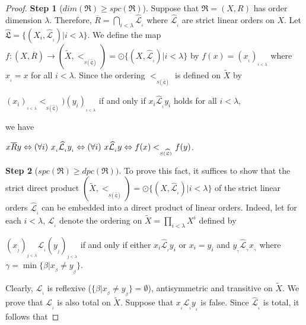 \documentclass{article}
\theoremstyle{definition}
\begin{document}
\begin{proof}{\bf Step 1} ($dim(\mathfrak{R})\geq spc(\mathfrak{R})$).
Suppose that $\mathfrak{R}=(X,R)$ has order dimension $\lambda$. Therefore, 
$\overline{R}=\displaystyle\bigcap_{i<\lambda}\widehat{\mathcal{L}}_{_i}$ where $\widehat{\mathcal{L}}_{_i}$ are strict linear orders
on $X$. Let $\widehat{\mathfrak{L}}=\{(X_i,\widehat{\mathcal{L}}_{_i})\vert i<\lambda\}$.
We define the map $f:(X,\overline{R})\longrightarrow (\widetilde{X},<_{_{S(\widehat{\mathfrak{L}})}})=\odot\{(X,\widehat{\mathcal{L}}_{_i})\vert i<\lambda\}$ by $f(x)=(x_{_i})_{_{i<\lambda}}$
where $x_{_i}=x$ for all $i<\lambda$.
Since the ordering $<_{_{S(\widehat{\mathfrak{L}})}}$ is defined on
$\widetilde{X}$ by
\begin{center}
$(x_{i})_{_{i<\lambda}} <_{_{S(\widehat{\mathfrak{L}})}}) (y_{i})_{_{i<\lambda}}$ if and only if $x_{i}\widehat{\mathcal{L}}_{_i} y_{i}$ holds for all $i<\lambda$,
\end{center}
we have
\begin{center}
$x\overline{R}y\Leftrightarrow {\rm (}\forall i{\rm )} \ x_{_i}\widehat{\mathcal{L}}_{_i}y_{_i}
\Leftrightarrow
{\rm (}\forall i{\rm )} \ x\widehat{\mathcal{L}}_{_i}y 
\Leftrightarrow 
f(x) <_{_{S(\widehat{\mathfrak{L}})}} f(y)$.
\end{center}
\par\smallskip\par\noindent
{\bf Step 2} ($spc(\mathfrak{R})\geq dpc(\mathfrak{R}))$.
To prove this fact, it suffices to show that the strict direct product
$(\widetilde{X},<_{_{S(\widehat{\mathfrak{L}})}})=\odot\{(X,\widehat{\mathcal{L}}_{_i})\vert i<\lambda\}$ of the strict linear orders
$\widehat{\mathcal{L}}_{_i}$
 can be embedded into a direct
product of linear orders. Indeed, let for each $i<\lambda$, $\mathcal{L}_{_i}$ denote the ordering
on 
$\widetilde{X}=\displaystyle\prod_{i<\lambda}X^i$
defined by
\begin{center}
$(x_{_j})_{_{j<\lambda}} \mathcal{L}_{_i} (y_{_j})_{_{j<\lambda}}$ if and only if either $x_i \widehat{\mathcal{L}}_{_i} y_i$ or
$x_i=y_i$ and $y_{_\gamma}\widehat{\mathcal{L}}_{_\gamma}x_{_\gamma}$ where $\gamma=\min\{\beta\vert
x_{_\beta}\neq y_{_\beta}\}$.
\end{center}
Clearly, $\mathcal{L}_{_i}$ is reflexive ($\{\beta\vert
x_{_\beta}\neq y_{_\beta}\}=\emptyset$), antisymmetric and transitive on 
$\widetilde{X}$.
We prove that $\mathcal{L}_{_i}$ is also total on 
$\widetilde{X}$. Suppose that $x_{_i} \mathcal{L}_{_i} y_{_i}$ is false.
Since $\widehat{\mathcal{L}}_{_i}$ is total, it follows that 

\end{proof}
\end{document}
